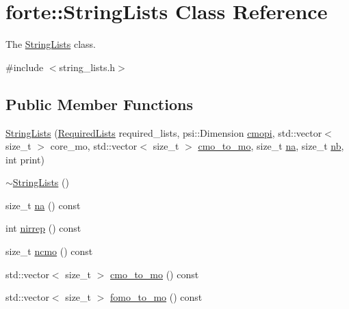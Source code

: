 \hypertarget{classforte_1_1_string_lists}{}\section{forte\+:\+:String\+Lists Class Reference}
\label{classforte_1_1_string_lists}


The \mbox{\hyperlink{classforte_1_1_string_lists}{String\+Lists}} class.  




{\ttfamily \#include $<$string\+\_\+lists.\+h$>$}

\subsection*{Public Member Functions}
\begin{DoxyCompactItemize}
\item 
\mbox{\hyperlink{classforte_1_1_string_lists_a9b4afa2c5e5252c985e90328464322ca}{String\+Lists}} (\mbox{\hyperlink{namespaceforte_a0adc3919f741515031673b80ab77f2c7}{Required\+Lists}} required\+\_\+lists, psi\+::\+Dimension \mbox{\hyperlink{classforte_1_1_string_lists_a879108b6547ae5a4e70b3d9adb3b32b2}{cmopi}}, std\+::vector$<$ size\+\_\+t $>$ core\+\_\+mo, std\+::vector$<$ size\+\_\+t $>$ \mbox{\hyperlink{classforte_1_1_string_lists_a322de4faf5f65b948cd5d2e916df0907}{cmo\+\_\+to\+\_\+mo}}, size\+\_\+t \mbox{\hyperlink{classforte_1_1_string_lists_a3afab2342eb6165b419cdfbe1d3620ba}{na}}, size\+\_\+t \mbox{\hyperlink{classforte_1_1_string_lists_afe2c8c337d3e77fc5d1fd0f033dc5959}{nb}}, int print)
\item 
\mbox{\hyperlink{classforte_1_1_string_lists_ad1ce86d38dcc5f4ded2070b18eafd644}{$\sim$\+String\+Lists}} ()
\item 
size\+\_\+t \mbox{\hyperlink{classforte_1_1_string_lists_a3afab2342eb6165b419cdfbe1d3620ba}{na}} () const
\item 
int \mbox{\hyperlink{classforte_1_1_string_lists_a6611c6c645d822a1722a60f76f1116ec}{nirrep}} () const
\item 
size\+\_\+t \mbox{\hyperlink{classforte_1_1_string_lists_a92d7067204784bfd5a27c84279671f60}{ncmo}} () const
\item 
std\+::vector$<$ size\+\_\+t $>$ \mbox{\hyperlink{classforte_1_1_string_lists_a322de4faf5f65b948cd5d2e916df0907}{cmo\+\_\+to\+\_\+mo}} () const
\item 
std\+::vector$<$ size\+\_\+t $>$ \mbox{\hyperlink{classforte_1_1_string_lists_a28a8bc1e367e1b5a89e36bb024cadae9}{fomo\+\_\+to\+\_\+mo}} () const

\end{DoxyCompactItemize}
